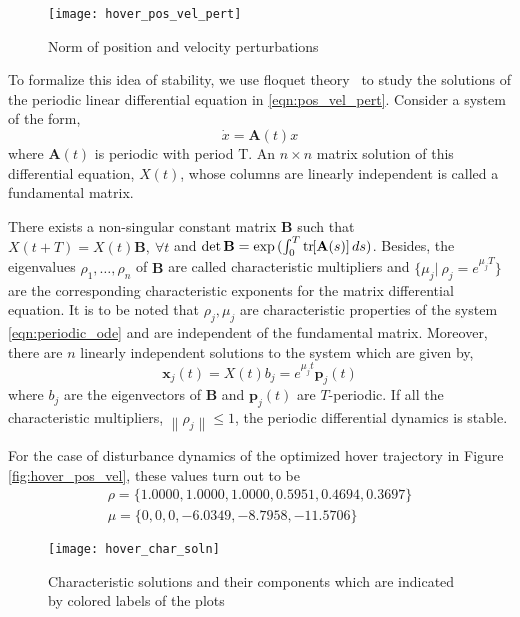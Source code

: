 \documentclass[10pt]{article}
\newcommand{\norm}[1]{\ensuremath{\left\| #1 \right\|}}
\newcommand{\bracket}[1]{\ensuremath{\left[ #1 \right]}}
\newcommand{\tr}[1]{\mathrm{tr}\ensuremath{\negthickspace\bracket{#1}}}
\begin{document}
\begin{figure}[h!]
	\centering
	\texttt{[image: hover\_pos\_vel\_pert]}
	\caption{Norm of position and velocity perturbations}
	\label{fig:pos_vel_pert}
\end{figure}

To formalize this idea of stability, we use floquet theory~\cite[Section 3.5]{teschl2012ordinary} to study the solutions of the periodic linear differential equation in \eqref{eqn:pos_vel_pert}. Consider a system of the form,
\begin{equation}\label{eqn:periodic_ode}
	\dot{x} = \mathbf{A}(t) x
\end{equation}
where $ \mathbf{A}(t) $ is periodic with period T. An $ n \times n $ matrix solution of this differential equation, $ X(t) $, whose columns are linearly independent is called a fundamental matrix.

There exists a non-singular constant matrix $ \mathbf{B} $ such that $ X(t+T) = X(t)\mathbf{B},\ \forall t $ and $ \det{\mathbf{B}} =\exp{(\int_{0}^{T} \tr{\mathbf{A}(s)} ds)} $. Besides, the eigenvalues $ \rho_1, \dots, \rho_n $ of $ \mathbf{B} $ are called characteristic multipliers and $ \lbrace \mu_j \vert\ \rho_j = e^{\mu_j T} \rbrace $ are the corresponding characteristic exponents for the matrix differential equation. It is to be noted that $ \rho_j, \mu_j $ are characteristic properties of the system \eqref{eqn:periodic_ode} and are independent of the fundamental matrix. Moreover, there are $ n $ linearly independent solutions to the system which are given by,
\[ \mathbf{x}_j(t) = X(t)b_j = e^{\mu_j t} \mathbf{p}_j(t)\]
where $ b_j $ are the eigenvectors of $ \mathbf{B} $ and $ \mathbf{p}_j(t) $ are $ T $-periodic. If all the characteristic multipliers, $ \norm{\rho_j} \le 1 $, the periodic differential dynamics is stable.

For the case of disturbance dynamics of the optimized hover trajectory in Figure \ref{fig:hover_pos_vel}, these values turn out to be
\begin{gather*}
	\rho = \lbrace 1.0000, 1.0000, 1.0000, 0.5951, 0.4694, 0.3697 \rbrace\\
	\mu = \lbrace 0, 0, 0, -6.0349, -8.7958, -11.5706 \rbrace
\end{gather*}

\begin{figure}[h!]
	\centering
	\texttt{[image: hover\_char\_soln]}
	\caption{Characteristic solutions and their components which are indicated by colored labels of the plots}
	\label{fig:hover_char_soln}
\end{figure}
\end{document}
